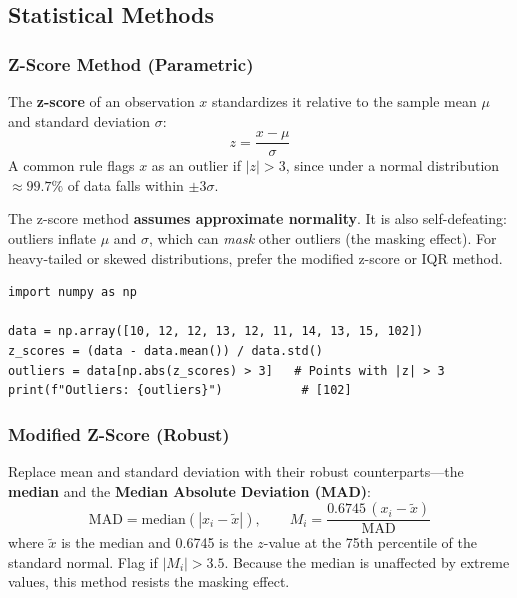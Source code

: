 \subsection*{Statistical Methods}

\subsubsection*{Z-Score Method (Parametric)}

\begin{definition}[Z-Score]
The \textbf{z-score} of an observation $x$ standardizes it relative to the sample mean $\mu$ and standard deviation $\sigma$:
$$z = \frac{x - \mu}{\sigma}$$
A common rule flags $x$ as an outlier if $|z| > 3$, since under a normal distribution $\approx 99.7\%$ of data falls within $\pm 3\sigma$.
\end{definition}

\begin{remark}[Limitation]
The z-score method \textbf{assumes approximate normality}. It is also self-defeating: outliers inflate $\mu$ and $\sigma$, which can \textit{mask} other outliers (the masking effect). For heavy-tailed or skewed distributions, prefer the modified z-score or IQR method.
\end{remark}

\begin{lstlisting}[style=pythonstyle]
import numpy as np

data = np.array([10, 12, 12, 13, 12, 11, 14, 13, 15, 102])
z_scores = (data - data.mean()) / data.std()
outliers = data[np.abs(z_scores) > 3]   # Points with |z| > 3
print(f"Outliers: {outliers}")           # [102]
\end{lstlisting}

\subsubsection*{Modified Z-Score (Robust)}

Replace mean and standard deviation with their robust counterparts---the \textbf{median} and the \textbf{Median Absolute Deviation (MAD)}:
$$\text{MAD} = \text{median}\left(|x_i - \widetilde{x}|\right), \qquad M_i = \frac{0.6745\,(x_i - \widetilde{x})}{\text{MAD}}$$
where $\widetilde{x}$ is the median and 0.6745 is the $z$-value at the 75th percentile of the standard normal. Flag if $|M_i| > 3.5$. Because the median is unaffected by extreme values, this method resists the masking effect.


